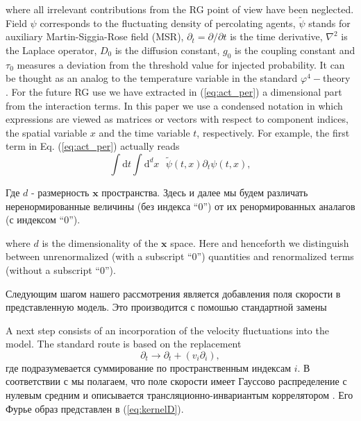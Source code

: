 \documentclass[12pt]{article}
\def\dRM{{\mathrm d}}
\def\mx{{\bm x}}
\begin{document}
where all irrelevant contributions from the RG point of view have been neglected.
Field $\psi$ corresponds to the fluctuating density of percolating agents,
$\tilde{\psi}$ stands for auxiliary Martin-Siggia-Rose field (MSR), 
$\partial_t = \partial / \partial t$ is
the time derivative, $\nabla^2$ is  the Laplace operator, $D_0$ 
is the diffusion constant, $g_0$ is the coupling constant and $\tau_0$ measures
 a deviation from the threshold value for injected probability. It can be thought
 as an analog to the temperature  variable in the standard $\varphi^4-$theory 
 \cite{JanTau04,Zinn}.
 For the future RG use  we have extracted  in (\ref{eq:act_per}) a 
 dimensional part from the interaction terms.
In this paper we use a condensed notation in which expressions are viewed
as matrices or vectors with respect to component indices, the spatial variable 
$x$ and the time variable $t$, respectively. 
For example, the first term in Eq. (\ref{eq:act_per}) actually reads
 \begin{equation}
   \int \dRM t \int \dRM^{d} x\mbox{ } \tilde{\psi}(t,x)
   \partial_t \psi(t, x),
 \end{equation}

Где $d$ - размерность $\mx$ пространства.
Здесь и далее мы будем различать неренормированные величины (без индекса ``0'') от их ренормированных аналагов (с индексом ``0'').

 where $d$ is the dimensionality of the $\mx$ space.
Here and henceforth 
we distinguish between
unrenormalized (with a subscript ``0'') quantities and renormalized terms
(without a subscript ``0'').

Следующим шагом нашего рассмотрения является добавления поля скорости в представленную модель.
Это производится с помошью стандартной замены  \cite{Landau_fluid}

A next step consists of an incorporation of the velocity fluctuations into
the model. The 
 standard route \cite{Landau_fluid} is based on the replacement 
\begin{equation}   
   \partial_t \rightarrow \partial_t +(v_i\partial_i),
   \label{eq:lagr_der}
\end{equation}
где подразумевается суммирование по пространственным индексам $i$.
В соответствии с \cite{Ant99,Ant00} мы полагаем, что поле скорости имеет Гауссово распределение с нулевым средним и описывается трансляционно-инвариантым коррелятором \cite{Ant00}. Его Фурье образ представлен в (\ref{eq:kernelD}).
\end{document}
